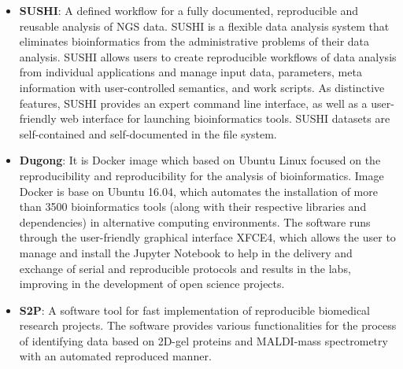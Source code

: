 \documentclass{vldb}
\begin{document}
\begin{itemize}
    \item \textbf{SUSHI}\cite{DBLP:journals/bmcbi/HatakeyamaORQSR16}: A defined workflow for a fully documented, reproducible and reusable analysis of NGS data. SUSHI is a flexible data analysis system that eliminates bioinformatics from the administrative problems of their data analysis. SUSHI allows users to create reproducible workflows of data analysis from individual applications and manage input data, parameters, meta information with user-controlled semantics, and work scripts. As distinctive features, SUSHI provides an expert command line interface, as well as a user-friendly web interface for launching bioinformatics tools. SUSHI datasets are self-contained and self-documented in the file system.
    \item \textbf{Dugong}\cite{DBLP:journals/bioinformatics/MenegidioJON18}: It is Docker image which based on Ubuntu Linux focused on the reproducibility and reproducibility for the analysis of bioinformatics. Image Docker is base on Ubuntu 16.04, which automates the installation of more than 3500 bioinformatics tools (along with their respective libraries and dependencies) in alternative computing environments. The software runs through the user-friendly graphical interface XFCE4, which allows the user to manage and install the Jupyter Notebook to help in the delivery and exchange of serial and reproducible protocols and results in the labs, improving in the development of open science projects.
    \item \textbf{S2P}\cite{DBLP:journals/cmpb/Lopez-Fernandez18}: A software tool for fast implementation of reproducible biomedical research projects. The software provides various functionalities for the process of identifying data based on 2D-gel proteins and MALDI-mass spectrometry with an automated reproduced manner.


\end{itemize}
\end{document}
